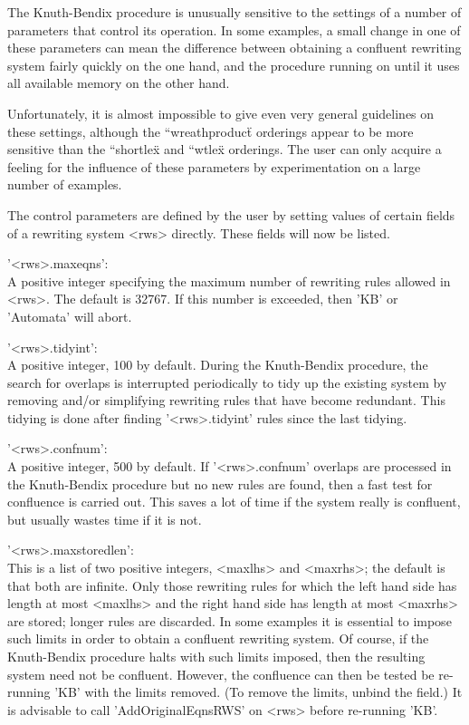 The Knuth-Bendix procedure is unusually sensitive to the settings of a
number of parameters  that control its  operation. In some examples, a
small change  in   one of  these  parameters can  mean the  difference
between  obtaining a confluent  rewriting system fairly quickly on the
one hand, and  the  procedure running  on until it  uses all available
memory on the other hand.

Unfortunately, it is   almost  impossible to  give even  very  general
guidelines   on these   settings,  although the    {``wreathproduct\"}
orderings appear to  be  more sensitive  than the {``shortlex\"}   and
{``wtlex\"} orderings.  The user  can  only acquire a  feeling for the
influence of these parameters by  experimentation on a large number of
examples.

The control  parameters are defined  by the user  by setting values of
certain fields of a rewriting system <rws> directly. These fields will
now be listed.

'<rws>.maxeqns': \\ 
        A positive integer specifying  the maximum number of rewriting
	rules allowed in <rws>.  The  default is 32767. If this number
	is exceeded, then 'KB' or 'Automata' will abort.

'<rws>.tidyint': \\
	A positive integer,  100 by default.  During the  Knuth-Bendix
	procedure, the search for overlaps is interrupted periodically
	to tidy up the existing system  by removing and/or simplifying
	rewriting rules  that have become  redundant. This  tidying is
	done  after    finding '<rws>.tidyint' rules    since the last
	tidying.

'<rws>.confnum': \\
	A  positive integer, 500    by  default.  If   '<rws>.confnum'
	overlaps are processed  in  the Knuth-Bendix procedure  but no
	new rules  are  found, then  a  fast test  for confluence   is
	carried out. This saves a lot of time  if the system really is
	confluent, but usually wastes time if it is not.

'<rws>.maxstoredlen': \\
        This    is a list   of  two   positive integers, <maxlhs>  and
	<maxrhs>; the  default is that both  are infinite.  Only those
	rewriting rules for  which the  left hand  side has  length at
	most   <maxlhs>  and the right hand    side has length at most
	<maxrhs> are stored;  longer   rules are  discarded. In   some
	examples it  is essential to   impose such limits in order  to
	obtain  a  confluent  rewriting   system. Of  course, if   the
	Knuth-Bendix procedure  halts with  such limits imposed,  then
	the    resulting system need   not be  confluent. However, the
	confluence can  then be  tested be  re-running 'KB'  with  the
	limits removed.  (To remove the  limits, unbind the field.) It
	is  advisable  to  call 'AddOriginalEqnsRWS'  on  <rws> before
	re-running 'KB'.

